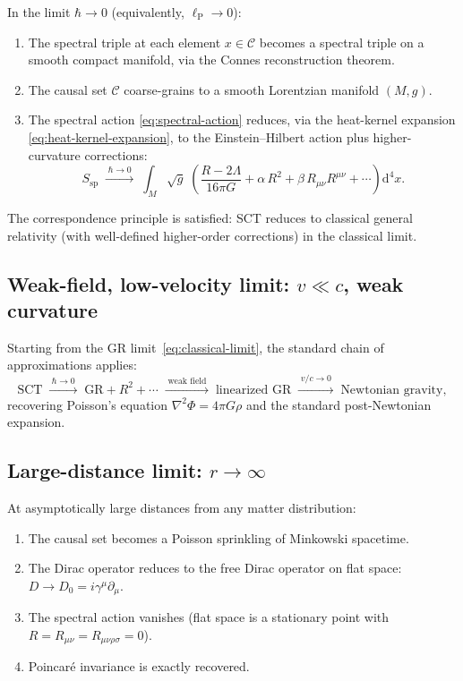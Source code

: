 \documentclass[12pt,a4paper]{article}
\theoremstyle{postulate}
\newcommand{\Dirac}{D}
\newcommand{\Causal}{\mathcal{C}}
\newcommand{\Sspectral}{S_{\mathrm{sp}}}
\newcommand{\planck}{\ell_{\mathrm{P}}}
\newcommand{\dd}{\mathrm{d}}
\begin{document}
In the limit $\hbar \to 0$ (equivalently, $\planck \to 0$):
\begin{enumerate}[label=(\roman*)]
  \item The spectral triple at each element $x \in \Causal$ becomes a
        spectral triple on a smooth compact manifold, via the Connes
        reconstruction theorem.
  \item The causal set $\Causal$ coarse-grains to a smooth Lorentzian
        manifold $(M, g)$.
  \item The spectral action \eqref{eq:spectral-action} reduces, via the
        heat-kernel expansion \eqref{eq:heat-kernel-expansion}, to the
        Einstein--Hilbert action plus higher-curvature corrections:
        \begin{equation}\label{eq:classical-limit}
          \Sspectral \;\xrightarrow{\;\hbar \to 0\;}\;
          \int_M \sqrt{g}\;\left(\frac{R - 2\Lambda}{16\pi G}
          + \alpha\, R^2 + \beta\, R_{\mu\nu}R^{\mu\nu}
          + \cdots \right) \dd^4 x.
        \end{equation}
\end{enumerate}
The correspondence principle is satisfied: SCT reduces to classical general
relativity (with well-defined higher-order corrections) in the classical
limit.

\subsection{Weak-field, low-velocity limit: $v \ll c$, weak curvature}

Starting from the GR limit~\eqref{eq:classical-limit}, the standard chain of
approximations applies:
\begin{equation}\label{eq:newtonian-chain}
  \text{SCT}
  \;\xrightarrow{\;\hbar \to 0\;}\;
  \text{GR} + R^2 + \cdots
  \;\xrightarrow{\;\text{weak field}\;}\;
  \text{linearized GR}
  \;\xrightarrow{\;v/c \to 0\;}\;
  \text{Newtonian gravity},
\end{equation}
recovering Poisson's equation $\nabla^2 \Phi = 4\pi G\rho$ and the standard
post-Newtonian expansion.

\subsection{Large-distance limit: $r \to \infty$}

At asymptotically large distances from any matter distribution:
\begin{enumerate}[label=(\roman*)]
  \item The causal set becomes a Poisson sprinkling of Minkowski spacetime.
  \item The Dirac operator reduces to the free Dirac operator on flat space:
        $\Dirac \to \Dirac_0 = i\gamma^\mu \partial_\mu$.
  \item The spectral action vanishes (flat space is a stationary point with
        $R = R_{\mu\nu} = R_{\mu\nu\rho\sigma} = 0$).
  \item Poincar\'e invariance is exactly recovered.
\end{enumerate}
\end{document}
